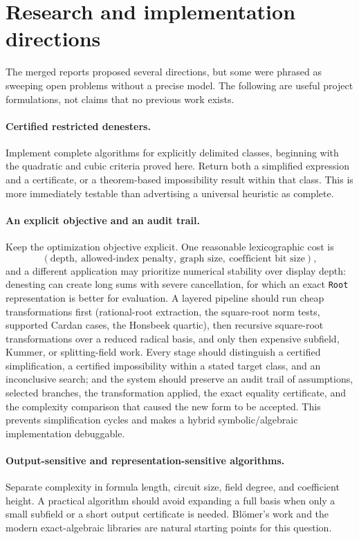 \documentclass[11pt,oneside]{article}
\numberwithin{equation}{section}
\theoremstyle{definition}
\theoremstyle{remark}
\begin{document}
\section{Research and implementation directions}\label{sec:directions}
The merged reports proposed several directions, but some were phrased as sweeping open problems without a precise model. The following are useful project formulations, not claims that no previous work exists.

\paragraph{Certified restricted denesters.} Implement complete algorithms for explicitly delimited classes, beginning with the quadratic and cubic criteria proved here. Return both a simplified expression and a certificate, or a theorem-based impossibility result within that class. This is more immediately testable than advertising a universal heuristic as complete.

\paragraph{An explicit objective and an audit trail.} Keep the optimization objective explicit. One reasonable lexicographic cost is
\[
(\text{depth},\ \text{allowed-index penalty},\ \text{graph size},\ \text{coefficient bit size}),
\]
and a different application may prioritize numerical stability over display depth: denesting can create long sums with severe cancellation, for which an exact \texttt{Root} representation is better for evaluation. A layered pipeline should run cheap transformations first (rational-root extraction, the square-root norm tests, supported Cardan cases, the Honsbeek quartic), then recursive square-root transformations over a reduced radical basis, and only then expensive subfield, Kummer, or splitting-field work. Every stage should distinguish a certified simplification, a certified impossibility within a stated target class, and an inconclusive search; and the system should preserve an audit trail of assumptions, selected branches, the transformation applied, the exact equality certificate, and the complexity comparison that caused the new form to be accepted. This prevents simplification cycles and makes a hybrid symbolic/algebraic implementation debuggable.

\paragraph{Output-sensitive and representation-sensitive algorithms.} Separate complexity in formula length, circuit size, field degree, and coefficient height. A practical algorithm should avoid expanding a full basis when only a small subfield or a short output certificate is needed. Bl\"omer's work and the modern exact-algebraic libraries are natural starting points for this question.
\end{document}
